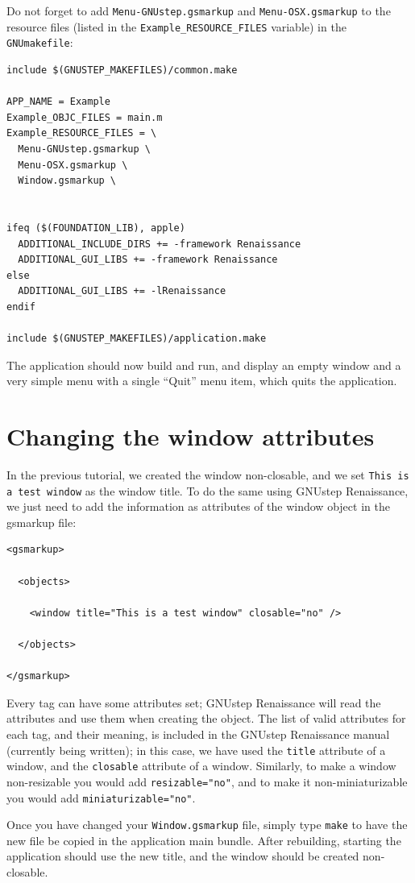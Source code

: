 \documentclass[a4paper]{article}
\begin{document}
Do not forget to add \texttt{Menu-GNUstep.gsmarkup} and
\texttt{Menu-OSX.gsmarkup} to the resource files (listed in the
\texttt{Example\_RESOURCE\_FILES} variable) in the
\texttt{GNUmakefile}:
\begin{verbatim}
include $(GNUSTEP_MAKEFILES)/common.make

APP_NAME = Example
Example_OBJC_FILES = main.m
Example_RESOURCE_FILES = \
  Menu-GNUstep.gsmarkup \
  Menu-OSX.gsmarkup \
  Window.gsmarkup \


ifeq ($(FOUNDATION_LIB), apple)
  ADDITIONAL_INCLUDE_DIRS += -framework Renaissance
  ADDITIONAL_GUI_LIBS += -framework Renaissance
else
  ADDITIONAL_GUI_LIBS += -lRenaissance
endif

include $(GNUSTEP_MAKEFILES)/application.make
\end{verbatim}

The application should now build and run, and display an empty window
and a very simple menu with a single ``Quit'' menu item, which quits
the application.

\section{Changing the window attributes}
In the previous tutorial, we created the window non-closable, and we
set \texttt{This is a test window} as the window title.  To do the
same using GNUstep Renaissance, we just need to add the information as
attributes of the window object in the gsmarkup file:
\begin{verbatim}
<gsmarkup>

  <objects>

    <window title="This is a test window" closable="no" />

  </objects>

</gsmarkup>
\end{verbatim}
Every tag can have some attributes set; GNUstep Renaissance will read
the attributes and use them when creating the object.  The list of
valid attributes for each tag, and their meaning, is included in the
GNUstep Renaissance manual (currently being written); in this case, we
have used the \texttt{title} attribute of a window, and the
\texttt{closable} attribute of a window.  Similarly, to make a window
non-resizable you would add \texttt{resizable="no"}, and to make it
non-miniaturizable you would add \texttt{miniaturizable="no"}.

Once you have changed your \texttt{Window.gsmarkup} file, simply type
\texttt{make} to have the new file be copied in the application main
bundle.  After rebuilding, starting the application should use the new
title, and the window should be created non-closable.
\end{document}
